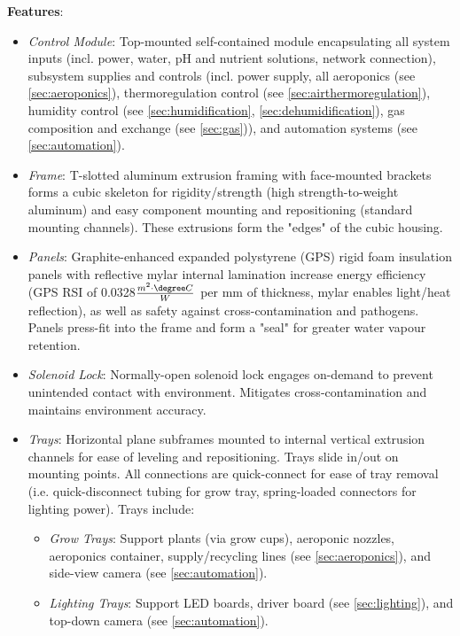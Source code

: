 \textbf{Features}:
\begin{itemize}
    \item \textit{Control Module}: Top-mounted self-contained module encapsulating all system inputs (incl. power, water, pH and nutrient solutions, network connection), subsystem supplies and controls (incl. power supply, all aeroponics (see \ref{sec:aeroponics}), thermoregulation control (see \ref{sec:airthermoregulation}), humidity control (see \ref{sec:humidification}, \ref{sec:dehumidification}), gas composition and exchange (see \ref{sec:gas})), and automation systems (see \ref{sec:automation}).
    \item \textit{Frame}: T-slotted aluminum extrusion framing with face-mounted brackets forms a cubic skeleton for rigidity/strength (high strength-to-weight aluminum) and easy component mounting and repositioning (standard mounting channels). These extrusions form the "edges" of the cubic housing. %
    \item \textit{Panels}: Graphite-enhanced expanded polystyrene (GPS) rigid foam insulation panels \cite{insulation} with reflective mylar internal lamination increase energy efficiency (GPS RSI of 0.0328$\frac{m^2 \cdot \degree C}{W}$ per mm of thickness, mylar enables light/heat reflection), as well as safety against cross-contamination and pathogens. Panels press-fit into the frame and form a "seal" for greater water vapour retention. %
    \item \textit{Solenoid Lock}: Normally-open solenoid lock engages on-demand to prevent unintended contact with environment. Mitigates cross-contamination and maintains environment accuracy.
    \item \textit{Trays}: Horizontal plane subframes mounted to internal vertical extrusion channels for ease of leveling and repositioning. Trays slide in/out on mounting points. All connections are quick-connect for ease of tray removal (i.e. quick-disconnect tubing for grow tray, spring-loaded connectors for lighting power). Trays include:
    \begin{itemize}
        \item \textit{Grow Trays}: Support plants (via grow cups), aeroponic nozzles, aeroponics container, supply/recycling lines (see \ref{sec:aeroponics}), and side-view camera (see \ref{sec:automation}).
        \item \textit{Lighting Trays}: Support LED boards, driver board (see \ref{sec:lighting}), and top-down camera (see \ref{sec:automation}).
    \end{itemize}
\end{itemize}

